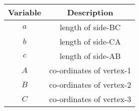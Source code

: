 \begin{tabular}[12pt]{ |c| c|}
    \hline
    \textbf{Variable} & \textbf{Description}\\ 
    \hline
    $a$ & length of side-BC \\
    \hline 
    $b$ & length of side-CA \\
    \hline
     $c$ & length of side-AB \\
     \hline
     $A$ & co-ordinates of vertex-1 \\
    \hline
    $B$ & co-ordinates of vertex-2 \\
    \hline
    $C$ & co-ordinates of vertex-3 \\
    \hline
    \end{tabular}
